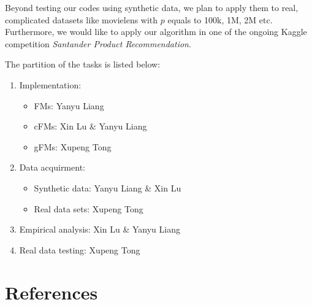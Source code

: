 \documentclass{article}
\begin{document}
Beyond testing our codes using synthetic data, we plan to apply them to real, complicated datasets like movielens with $p$ equals to 100k, 1M, 2M etc. Furthermore, we would like to apply our algorithm in one of the ongoing Kaggle competition \textit{Santander Product Recommendation}.

The partition of the tasks is listed below:
\begin{enumerate}
  \item Implementation:
    \begin{itemize}
      \item FMs: Yanyu Liang
      \item cFMs: Xin Lu \& Yanyu Liang
      \item gFMs: Xupeng Tong
    \end{itemize}
  \item Data acquirment:
    \begin{itemize}
      \item Synthetic data: Yanyu Liang \& Xin Lu
      \item Real data sets: Xupeng Tong
    \end{itemize}
  \item Empirical analysis: Xin Lu \& Yanyu Liang
  \item Real data testing: Xupeng Tong
\end{enumerate}


\section*{References}
\small{
\renewcommand{\section}[2]{}%
 

}
\end{document}
